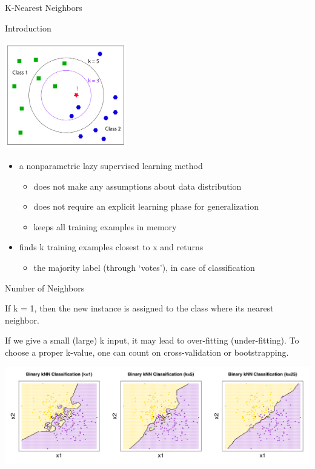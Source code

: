 \documentclass[ignorenonframetext,]{beamer}
\providecommand{\tightlist}{%
  \setlength{\itemsep}{0pt}\setlength{\parskip}{0pt}}
\begin{document}
\begin{frame}[fragile]{K-Nearest Neighbors}

\begin{block}{Introduction}

\begin{center}\includegraphics[width=200px]{knn1} \end{center}

\begin{itemize}
\tightlist
\item
  a nonparametric lazy supervised learning method

  \begin{itemize}
  \tightlist
  \item
    does not make any assumptions about data distribution
  \item
    does not require an explicit learning phase for generalization
  \item
    keeps all training examples in memory
  \end{itemize}
\item
  finds k training examples closest to x and returns

  \begin{itemize}
  \tightlist
  \item
    the majority label (through `votes'), in case of classification
  \end{itemize}
\end{itemize}

\end{block}

\begin{block}{Number of Neighbors}

If k = 1, then the new instance is assigned to the class where its
nearest neighbor.

If we give a small (large) k input, it may lead to over-fitting
(under-fitting). To choose a proper k-value, one can count on
cross-validation or bootstrapping.

\includegraphics[width=800px]{knn2}


\end{block}
\end{frame}
\end{document}
